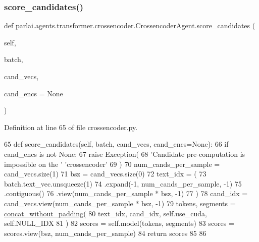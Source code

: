 \subsubsection{\texorpdfstring{score\+\_\+candidates()}{score\_candidates()}}
{\footnotesize\ttfamily def parlai.\+agents.\+transformer.\+crossencoder.\+Crossencoder\+Agent.\+score\+\_\+candidates (\begin{DoxyParamCaption}\item[{}]{self,  }\item[{}]{batch,  }\item[{}]{cand\+\_\+vecs,  }\item[{}]{cand\+\_\+encs = {\ttfamily None} }\end{DoxyParamCaption})}



Definition at line 65 of file crossencoder.\+py.


\begin{DoxyCode}
65     \textcolor{keyword}{def }score\_candidates(self, batch, cand\_vecs, cand\_encs=None):
66         \textcolor{keywordflow}{if} cand\_encs \textcolor{keywordflow}{is} \textcolor{keywordflow}{not} \textcolor{keywordtype}{None}:
67             \textcolor{keywordflow}{raise} Exception(
68                 \textcolor{stringliteral}{'Candidate pre-computation is impossible on the '} \textcolor{stringliteral}{'crossencoder'}
69             )
70         num\_cands\_per\_sample = cand\_vecs.size(1)
71         bsz = cand\_vecs.size(0)
72         text\_idx = (
73             batch.text\_vec.unsqueeze(1)
74             .expand(-1, num\_cands\_per\_sample, -1)
75             .contiguous()
76             .view(num\_cands\_per\_sample * bsz, -1)
77         )
78         cand\_idx = cand\_vecs.view(num\_cands\_per\_sample * bsz, -1)
79         tokens, segments = \hyperlink{namespaceparlai_1_1agents_1_1bert__ranker_1_1cross__encoder__ranker_a3914765cd62574f6f077c6e2e0070ab4}{concat\_without\_padding}(
80             text\_idx, cand\_idx, self.use\_cuda, self.NULL\_IDX
81         )
82         scores = self.model(tokens, segments)
83         scores = scores.view(bsz, num\_cands\_per\_sample)
84         \textcolor{keywordflow}{return} scores
85 
86 
\end{DoxyCode}
\mbox{\label{classparlai_1_1agents_1_1transformer_1_1crossencoder_1_1CrossencoderAgent_a736057f000f0d4cdb5d006e10c4291db}} 
